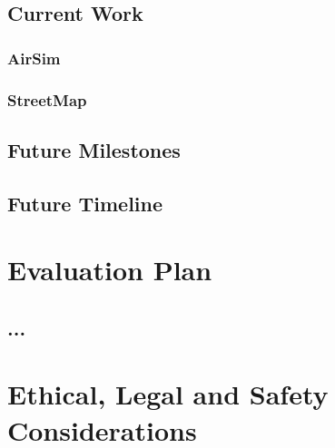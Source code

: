 \documentclass[11pt,oneside]{report}
\begin{document}
\section{Current Work}
\subsection{AirSim}
\subsection{StreetMap}
\section{Future Milestones}
\section{Future Timeline}

\chapter{Evaluation Plan}
\section{...}

\chapter{Ethical, Legal and Safety Considerations}



\newpage
\nocite{*}

\end{document}
